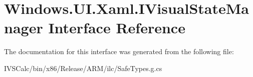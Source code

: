 \hypertarget{interface_windows_1_1_u_i_1_1_xaml_1_1_i_visual_state_manager}{}\section{Windows.\+U\+I.\+Xaml.\+I\+Visual\+State\+Manager Interface Reference}
\label{interface_windows_1_1_u_i_1_1_xaml_1_1_i_visual_state_manager}


The documentation for this interface was generated from the following file\+:\begin{DoxyCompactItemize}
\item 
I\+V\+S\+Calc/bin/x86/\+Release/\+A\+R\+M/ilc/Safe\+Types.\+g.\+cs\end{DoxyCompactItemize}
